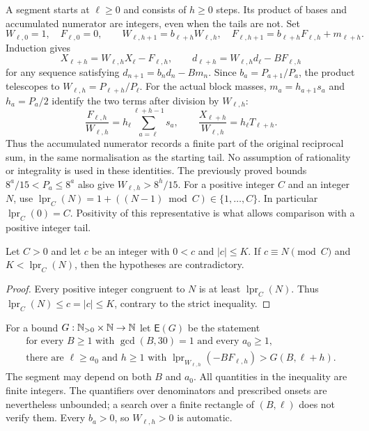 \documentclass[11pt]{article}
\theoremstyle{remark}
\theoremstyle{plain}
\newcommand{\lpr}{\operatorname{lpr}}
\newcommand{\Esc}{\mathsf E}
\begin{document}
A segment starts at $\ell\ge0$ and consists of $h\ge0$ steps.  Its product
of bases and accumulated numerator are integers, even when the tails are
not.  Set
\[
 W_{\ell,0}=1,\quad F_{\ell,0}=0,\qquad
 W_{\ell,h+1}=b_{\ell+h}W_{\ell,h},\quad
 F_{\ell,h+1}=b_{\ell+h}F_{\ell,h}+m_{\ell+h}.
\]
Induction gives
\begin{equation}\label{long269:eq:window-identity}
 X_{\ell+h}=W_{\ell,h}X_\ell-F_{\ell,h},\qquad
 d_{\ell+h}=W_{\ell,h}d_\ell-BF_{\ell,h}
\end{equation}
for any sequence satisfying $d_{n+1}=b_nd_n-Bm_n$.
Since $b_a=P_{a+1}/P_a$, the product telescopes to
$W_{\ell,h}=P_{\ell+h}/P_\ell$.  For the actual block masses,
$m_a=h_{a+1}s_a$ and $h_a=P_a/2$ identify the two terms after division
by $W_{\ell,h}$:
\[
 \frac{F_{\ell,h}}{W_{\ell,h}}
 =h_\ell\sum_{a=\ell}^{\ell+h-1}s_a,
 \qquad
 \frac{X_{\ell+h}}{W_{\ell,h}}=h_\ell T_{\ell+h}.
\]
Thus the accumulated numerator records a finite part of the original
reciprocal sum, in the same normalisation as the starting tail. No
assumption of rationality or integrality is used in these identities.
The previously proved bounds $8^a/15<P_a\le8^a$ also give
$W_{\ell,h}>8^h/15$.
For a positive integer $C$ and an integer $N$, use
$\lpr_C(N)=1+((N-1)\bmod C)\in\{1,\ldots,C\}$.
In particular $\lpr_C(0)=C$.  Positivity of this representative is what
allows comparison with a positive integer tail.

\begin{proposition}\label{long269:res:consumer}
Let $C>0$ and let $c$ be an integer with $0<c$ and $|c|\le K$.  If
$c\equiv N\pmod C$ and $K<\lpr_C(N)$, then the hypotheses are contradictory.
\end{proposition}

\begin{proof}
Every positive integer congruent to $N$ is at least $\lpr_C(N)$.
Thus $\lpr_C(N)\le c=|c|\le K$, contrary to the strict inequality.
\end{proof}


For a bound $G:\mathbb{N}_{>0}\times\mathbb{N}\to\mathbb{N}$ let $\Esc(G)$ be the statement
\begin{equation}\label{long269:eq:actual-escape}
 \begin{gathered}
 \text{for every }B\ge1\text{ with }\gcd(B,30)=1\text{ and every }a_0\ge1,\\
 \text{there are }\ell\ge a_0\text{ and }h\ge1\text{ with }
 \lpr_{W_{\ell,h}}(-BF_{\ell,h})>G(B,\ell+h) .
 \end{gathered}
\end{equation}
The segment may depend on both $B$ and $a_0$.  All quantities in the
inequality are finite integers.  The quantifiers over denominators and
prescribed onsets are nevertheless unbounded; a search over a finite
rectangle of $(B,\ell)$ does not verify them.  Every $b_a>0$, so
$W_{\ell,h}>0$ is automatic.
\end{document}
